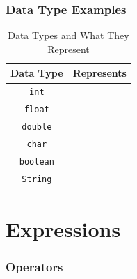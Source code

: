 \documentclass{beamer}
\begin{document}
\begin{frame}
    \frametitle{Data Type Examples}
    \begin{table}[h]
        \centering
        \begin{tabular}{|c|c|}
            \hline
                            \textbf{Data Type} & \textbf{Represents} \\ \hline
                            \texttt{int} & \hspace{5cm} \\ \hline
                            \texttt{float} & \hspace{5cm} \\ \hline
                            \texttt{double} & \hspace{5cm} \\ \hline
                            \texttt{char} & \hspace{5cm} \\ \hline
                            \texttt{boolean} & \hspace{5cm} \\ \hline
                            \texttt{String} & \hspace{5cm} \\ \hline
                        \end{tabular}
        \caption{Data Types and What They Represent}
        \label{tab:data_types}
    \end{table}
\end{frame}

\section{Expressions}

\begin{frame}
    \frametitle{Operators}
    \begin{itemize}




    \end{itemize}
\end{frame}
\end{document}
